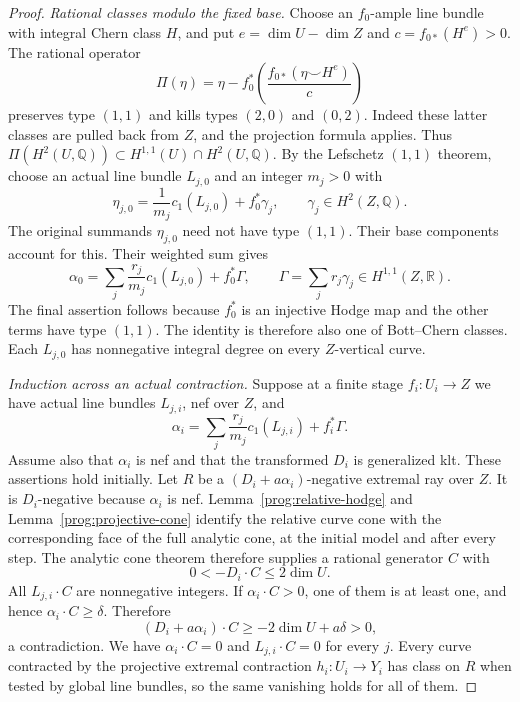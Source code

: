 \begin{proof}
\emph{Rational classes modulo the fixed base.}
Choose an $f_0$-ample line bundle with integral Chern class $H$, and
put $e=\dim U-\dim Z$ and $c=f_{0*}(H^e)>0$. The rational operator
\[
 \Pi(\eta)=\eta-
 f_0^*\!\left(\frac{f_{0*}(\eta\smile H^e)}{c}\right)
\]
preserves type $(1,1)$ and kills types $(2,0)$ and $(0,2)$.
Indeed these latter classes are pulled back from $Z$, and the
projection formula applies. Thus
$\Pi(H^2(U,\mathbb Q))\subset H^{1,1}(U)\cap H^2(U,\mathbb Q)$.
By the Lefschetz $(1,1)$ theorem, choose an actual line bundle
$L_{j,0}$ and an integer $m_j>0$ with
\[
 \eta_{j,0}=\frac1{m_j}c_1(L_{j,0})+f_0^*\gamma_j,
 \qquad \gamma_j\in H^2(Z,\mathbb Q).
\]
The original summands $\eta_{j,0}$ need not have type $(1,1)$.
Their base components account for this. Their weighted sum gives
\begin{equation}\label{prog:eq:relative-nqc}
 \alpha_0=\sum_j\frac{r_j}{m_j}c_1(L_{j,0})+f_0^*\Gamma,
 \qquad \Gamma=\sum_jr_j\gamma_j\in H^{1,1}(Z,\mathbb R).
\end{equation}
The final assertion follows because $f_0^*$ is an injective Hodge
map and the other terms have type $(1,1)$. The identity is therefore
also one of Bott--Chern classes.
Each $L_{j,0}$ has nonnegative integral degree on every
$Z$-vertical curve.

\smallskip\noindent
\emph{Induction across an actual contraction.}
Suppose at a finite stage $f_i:U_i\to Z$ we have actual line bundles
$L_{j,i}$, nef over $Z$, and
\[
 \alpha_i=\sum_j\frac{r_j}{m_j}c_1(L_{j,i})+f_i^*\Gamma.
\]
Assume also that $\alpha_i$ is nef and that the transformed
$D_i$ is generalized klt. These assertions hold initially.
Let $R$ be a $(D_i+a\alpha_i)$-negative extremal ray over $Z$.
It is $D_i$-negative because $\alpha_i$ is nef. Lemma~\ref{prog:relative-hodge} and Lemma~\ref{prog:projective-cone}
identify the relative curve cone with the corresponding face of the
full analytic cone, at the initial model and after every step. The
analytic cone theorem therefore supplies a rational generator $C$ with
\[
                     0<-D_i\cdot C\leq2\dim U.
\]
All $L_{j,i}\cdot C$ are nonnegative integers. If
$\alpha_i\cdot C>0$, one of them is at least one, and hence
$\alpha_i\cdot C\geq\delta$. Therefore
\[
 (D_i+a\alpha_i)\cdot C
             \geq-2\dim U+a\delta>0,
\]
a contradiction. We have $\alpha_i\cdot C=0$ and
$L_{j,i}\cdot C=0$ for every $j$. Every curve contracted by the
projective extremal contraction $h_i:U_i\to Y_i$ has class on
$R$ when tested by global line bundles, so the same vanishing
holds for all of them.


\end{proof}
